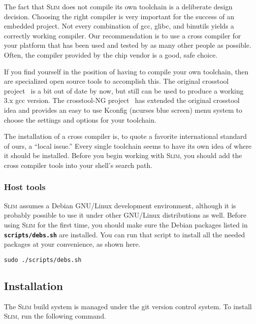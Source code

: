 \documentclass[a4paper,10pt]{article}
\newcommand{\slim}{\textsc{Slim}\xspace}
\newcommand{\fw}{\tt\bf}
\begin{document}
    The fact that \slim does not compile its own toolchain is a
    deliberate design decision.  Choosing the right compiler is very
    important for the success of an embedded project.  Not every
    combination of gcc, glibc, and binutils yields a correctly working
    compiler.  Our recommendation is to use a cross compiler for your
    platform that has been used and tested by as many other people as
    possible.  Often, the compiler provided by the chip vendor is a
    good, safe choice.

    If you find yourself in the position of having to compile your own
    toolchain, then are specialized open source tools to accomplish
    this.
    The original crosstool project~\cite{kegel} is a bit out of date
    by now, but still can be used to produce a working 3.x gcc
    version.
    The crosstool-NG project~\cite{morin} has extended the original
    crosstool idea and provides an easy to use Kconfig (ncurses blue
    screen) menu system to choose the settings and options for your
    toolchain.

    The installation of a cross compiler is, to quote a favorite
    international standard of ours, a ``local issue.''  Every single
    toolchain seems to have its own idea of where it should be
    installed.  Before you begin working with \slim, you should add
    the cross compiler tools into your shell's search path.

\subsubsection{Host tools}

    \slim assumes a Debian GNU/Linux development environment, although
    it is probably possible to use it under other GNU/Linux distributions
    as well. Before using \slim for the first time, you should make
    sure the Debian packages listed in {\fw scripts/debs.sh} are
    installed. You can run that script to install all the needed
    packages at your convenience, as shown here.

\begin{lstlisting}
sudo ./scripts/debs.sh
\end{lstlisting}

\subsection{Installation}

    The \slim build system is managed under the git version control
    system. To install \slim, run the following command.
\end{document}
